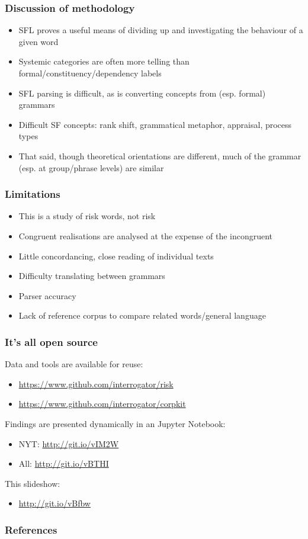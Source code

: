 \documentclass{beamer}       %
\begin{document}
\begin{frame}
    \frametitle{Discussion of methodology}
    
    \begin{itemize}
    \item SFL proves a useful means of dividing up and investigating the behaviour of a given word
    \item Systemic categories are often more telling than formal\slash constituency\slash dependency labels
    \item SFL parsing is difficult, as is converting concepts from (esp. formal) grammars
    \item Difficult SF concepts: rank shift, grammatical metaphor, appraisal, process types \cite{yan_automatic_2014,costetchi_semantic_2013,heyvaert_nominalization_2003}
    \item That said, though theoretical orientations are different, much of the grammar (esp. at group\slash phrase levels) are similar
    \end{itemize}
\end{frame}

\begin{frame}\frametitle{Limitations}

\begin{itemize}
    \item This is a study of risk words, not risk
    \item Congruent realisations are analysed at the expense of the incongruent
    \item Little concordancing, close reading of individual texts
    \item Difficulty translating between grammars
    \item Parser accuracy
    \item Lack of reference corpus to compare related words\slash general language
\end{itemize}
    
\end{frame}

\begin{frame}
    \frametitle{It's all open source}
    Data and tools are available for reuse:
    \begin{itemize}
    \item \url{https://www.github.com/interrogator/risk}
    \item \url{https://www.github.com/interrogator/corpkit}
    \end{itemize}
    Findings are presented dynamically in an Jupyter Notebook: 
    \begin{itemize}
    \item NYT: \url{http://git.io/vIM2W}
    \item All: \url{http://git.io/vBTHI}
    \end{itemize}
    This slideshow:
    \begin{itemize}
    \item \url{http://git.io/vBfbw}
    \end{itemize}
\end{frame}

    \begin{frame}[t,allowframebreaks]
    \frametitle{References}
    
    
    \end{frame}
    
    
\end{document}
